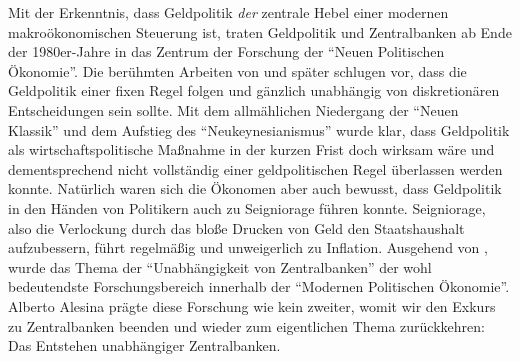 Mit der Erkenntnis, dass Geldpolitik \textit{der} zentrale Hebel einer modernen makroökonomischen Steuerung ist, traten Geldpolitik und Zentralbanken ab Ende der 1980er-Jahre in das Zentrum der Forschung der "`Neuen Politischen Ökonomie"'. Die berühmten Arbeiten von \textcite{Friedman1968} und später \textcite{Kydland1977} schlugen vor, dass die Geldpolitik einer fixen Regel folgen und gänzlich unabhängig von diskretionären Entscheidungen sein sollte. Mit dem allmählichen Niedergang der "`Neuen Klassik"' und dem Aufstieg des "`Neukeynesianismus"' wurde klar, dass Geldpolitik als wirtschaftspolitische Maßnahme in der kurzen Frist doch wirksam wäre und dementsprechend nicht vollständig einer geldpolitischen Regel überlassen werden konnte. Natürlich waren sich die Ökonomen aber auch bewusst, dass Geldpolitik in den Händen von Politikern auch zu Seigniorage führen konnte. Seigniorage, also die Verlockung durch das bloße Drucken von Geld den Staatshaushalt aufzubessern, führt regelmäßig und unweigerlich zu Inflation. Ausgehend von \textcite{Alesina1987}, \textcite{Alesina1988c} wurde das Thema der "`Unabhängigkeit von Zentralbanken"' der wohl bedeutendste Forschungsbereich innerhalb der "`Modernen Politischen Ökonomie"'. Alberto Alesina prägte diese Forschung wie kein zweiter, womit wir den Exkurs zu Zentralbanken beenden und wieder zum eigentlichen Thema zurückkehren: Das Entstehen unabhängiger Zentralbanken.


